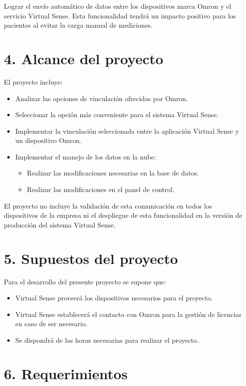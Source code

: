 \documentclass[
11pt, %
]{charter}
\begin{document}
Lograr el envío automático de datos entre los dispositivos marca Omron y el servicio Virtual Sense. Esta funcionalidad tendrá un impacto positivo para los pacientes al evitar la carga manual de mediciones.

\section{4. Alcance del proyecto}
\label{sec:alcance}

El proyecto incluye:
\begin{itemize}
	\item Analizar las opciones de vinculación ofrecidas por Omron.
	\item Seleccionar la opción más conveniente para el sistema Virtual Sense.
	\item Implementar la vinculación seleccionada entre la aplicación Virtual Sense y un dispositivo Omron.
	\item Implementar el manejo de los datos en la nube:
	\begin{itemize}
		\item Realizar las modificaciones necesarias en la base de datos.
		\item Realizar las modificaciones en el panel de control.
	\end{itemize}
\end{itemize}

El proyecto no incluye la validación de esta comunicación en todos los dispositivos de la empresa ni el despliegue de esta funcionalidad en la versión de producción del sistema Virtual Sense.

\section{5. Supuestos del proyecto}
\label{sec:supuestos}

Para el desarrollo del presente proyecto se supone que:

\begin{itemize}
	\item Virtual Sense proveerá los dispositivos necesarios para el proyecto.
	\item Virtual Sense establecerá el contacto con Omron para la gestión de licencias en caso de ser necesario.
	\item Se dispondrá de las horas necesarias para realizar el proyecto.
\end{itemize}


\section{6. Requerimientos}
\label{sec:requerimientos}
\end{document}
